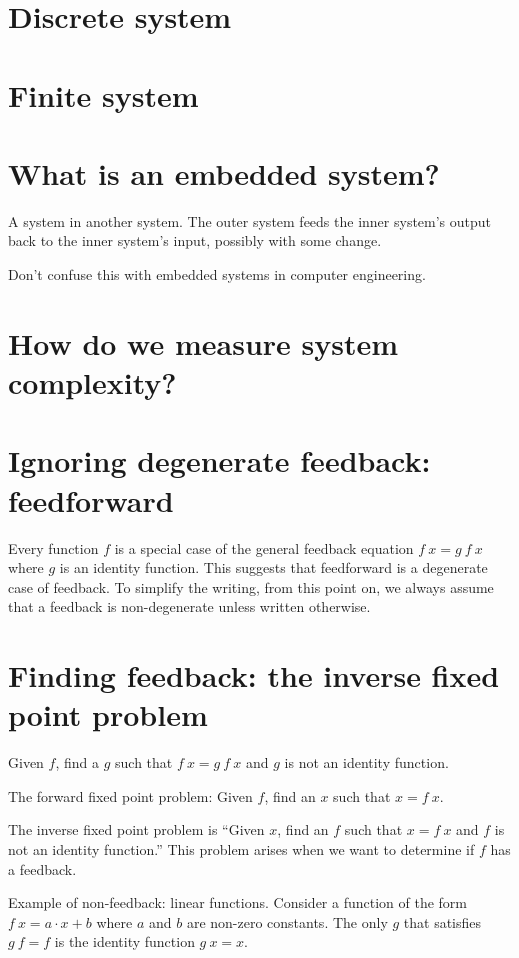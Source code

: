 \section{Discrete system}

\section{Finite system}

\section{What is an embedded system?}

A system in another system.
The outer system feeds the inner system's output back to the inner system's input,
possibly with some change.

Don't confuse this with embedded systems in computer engineering.

\section{How do we measure system complexity?}

\section{Ignoring degenerate feedback: feedforward}

Every function \(f\) is a special case of the general feedback equation \(f~x = g~f~x\)
where \(g\) is an identity function.
This suggests that feedforward is a degenerate case of feedback.
To simplify the writing, from this point on,
we always assume that a feedback is non-degenerate
unless written otherwise.

\section{Finding feedback: the inverse fixed point problem}

Given \(f\), find a \(g\) such that \(f~x = g~f~x\) and \(g\) is not an identity function.

The forward fixed point problem:
Given \(f\), find an \(x\) such that \(x=f~x\).

The inverse fixed point problem is
``Given \( x \), find an \( f \) such that \( x = f~x \) and \(f\) is not an identity function.''
This problem arises when we want to determine
if \(f\) has a feedback.

Example of non-feedback: linear functions.
Consider a function of the form \(f~x = a \cdot x + b\) where \(a\) and \(b\) are non-zero constants.
The only \(g\) that satisfies \(g~f = f\) is the identity function \(g~x=x\).

